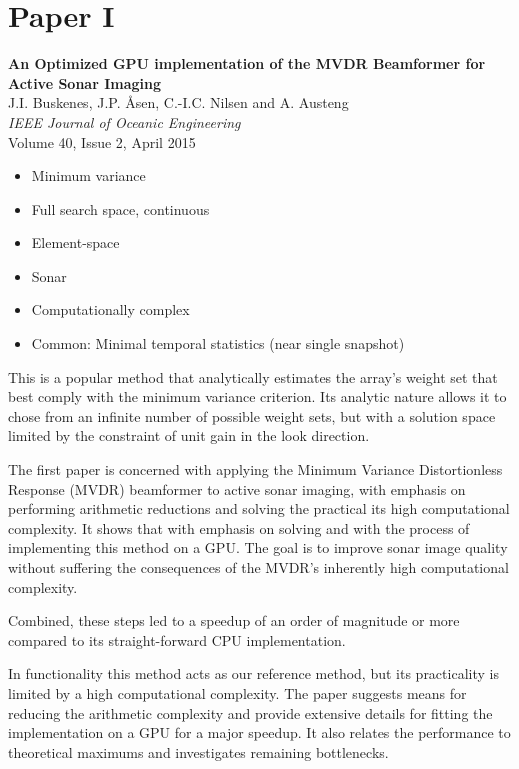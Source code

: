 \section{Paper I}\label{sec:paperI} %
\textbf{An Optimized GPU implementation of the MVDR Beamformer for Active Sonar Imaging}\\
J.I. Buskenes, J.P. Åsen, C.-I.C. Nilsen and A. Austeng\\
\textit{IEEE Journal of Oceanic Engineering}\\
Volume 40, Issue 2, April 2015

\begin{itemize}
\item Minimum variance
\item Full search space, continuous
\item Element-space
\item Sonar
\item Computationally complex
\item Common: Minimal temporal statistics (near single snapshot)
\end{itemize}

This is a popular method that analytically estimates the array's weight set that best comply with the minimum variance criterion. Its analytic nature allows it to chose from an infinite number of possible weight sets, but with a solution space limited by the constraint of unit gain in the look direction. 

The first paper is concerned with applying the Minimum Variance Distortionless Response (MVDR) beamformer to active sonar imaging, with emphasis on performing arithmetic reductions and solving the practical its high computational complexity. It shows that  with emphasis on solving and with the process of implementing this method on a \gls{GPU}. The goal is to improve sonar image quality without suffering the consequences of the MVDR's inherently high computational complexity.

Combined, these steps led to a speedup of an order of magnitude or more compared to its straight-forward \gls{CPU} implementation.

In functionality this method acts as our reference method, but its practicality is limited by a high computational complexity. The paper suggests means for reducing the arithmetic complexity and provide extensive details for fitting the implementation on a \gls{GPU} for a major speedup. It also relates the performance to theoretical maximums and investigates remaining bottlenecks.


